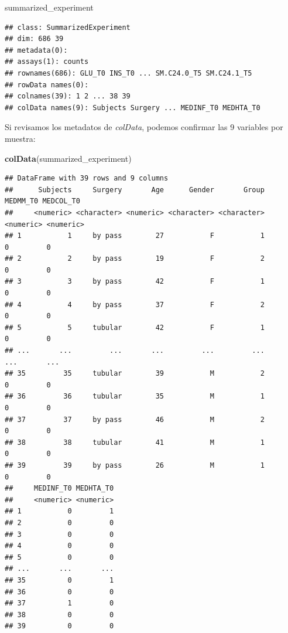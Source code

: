 \documentclass[
]{article}
\newenvironment{Shaded}{\begin{snugshade}}{\end{snugshade}}
\newcommand{\FunctionTok}[1]{\textcolor[rgb]{0.13,0.29,0.53}{\textbf{#1}}}
\newcommand{\NormalTok}[1]{#1}
\begin{document}
\begin{Shaded}
\begin{Highlighting}[]
\NormalTok{summarized\_experiment}
\end{Highlighting}
\end{Shaded}

\begin{verbatim}
## class: SummarizedExperiment 
## dim: 686 39 
## metadata(0):
## assays(1): counts
## rownames(686): GLU_T0 INS_T0 ... SM.C24.0_T5 SM.C24.1_T5
## rowData names(0):
## colnames(39): 1 2 ... 38 39
## colData names(9): Subjects Surgery ... MEDINF_T0 MEDHTA_T0
\end{verbatim}

Si revisamos los metadatos de \emph{colData}, podemos confirmar las 9
variables por muestra:

\begin{Shaded}
\begin{Highlighting}[]
\FunctionTok{colData}\NormalTok{(summarized\_experiment)}
\end{Highlighting}
\end{Shaded}

\begin{verbatim}
## DataFrame with 39 rows and 9 columns
##      Subjects     Surgery       Age      Gender       Group  MEDMM_T0 MEDCOL_T0
##     <numeric> <character> <numeric> <character> <character> <numeric> <numeric>
## 1           1     by pass        27           F           1         0         0
## 2           2     by pass        19           F           2         0         0
## 3           3     by pass        42           F           1         0         0
## 4           4     by pass        37           F           2         0         0
## 5           5     tubular        42           F           1         0         0
## ...       ...         ...       ...         ...         ...       ...       ...
## 35         35     tubular        39           M           2         0         0
## 36         36     tubular        35           M           1         0         0
## 37         37     by pass        46           M           2         0         0
## 38         38     tubular        41           M           1         0         0
## 39         39     by pass        26           M           1         0         0
##     MEDINF_T0 MEDHTA_T0
##     <numeric> <numeric>
## 1           0         1
## 2           0         0
## 3           0         0
## 4           0         0
## 5           0         0
## ...       ...       ...
## 35          0         1
## 36          0         0
## 37          1         0
## 38          0         0
## 39          0         0
\end{verbatim}
\end{document}
